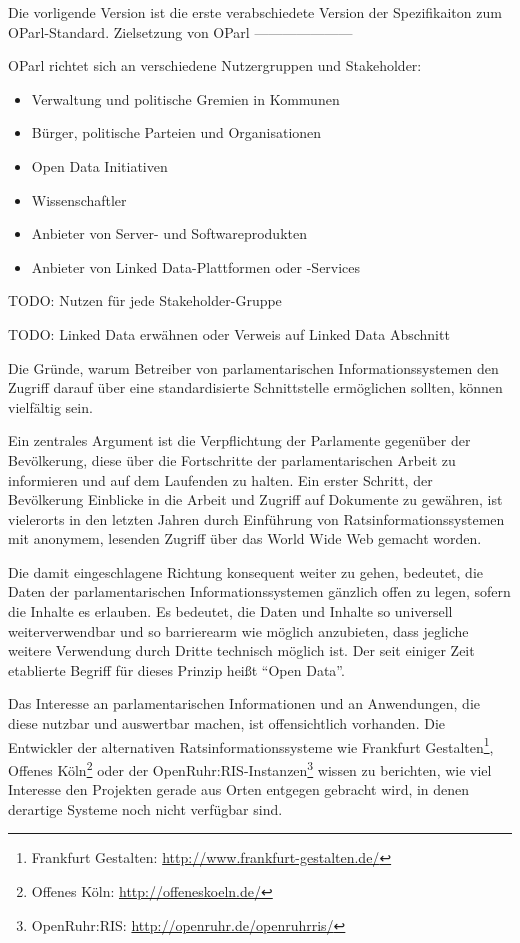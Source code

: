\documentclass[,a4paper]{article}
\begin{document}
Die vorligende Version ist die erste verabschiedete Version der
Spezifikaiton zum OParl-Standard. Zielsetzung von OParl
---------------------

OParl richtet sich an verschiedene Nutzergruppen und Stakeholder:

\begin{itemize}
\itemsep1pt\parskip0pt
\item
  Verwaltung und politische Gremien in Kommunen
\item
  Bürger, politische Parteien und Organisationen
\item
  Open Data Initiativen
\item
  Wissenschaftler
\item
  Anbieter von Server- und Softwareprodukten
\item
  Anbieter von Linked Data-Plattformen oder -Services
\end{itemize}

TODO: Nutzen für jede Stakeholder-Gruppe

TODO: Linked Data erwähnen oder Verweis auf Linked Data Abschnitt

Die Gründe, warum Betreiber von parlamentarischen Informationssystemen
den Zugriff darauf über eine standardisierte Schnittstelle ermöglichen
sollten, können vielfältig sein.

Ein zentrales Argument ist die Verpflichtung der Parlamente gegenüber
der Bevölkerung, diese über die Fortschritte der parlamentarischen
Arbeit zu informieren und auf dem Laufenden zu halten. Ein erster
Schritt, der Bevölkerung Einblicke in die Arbeit und Zugriff auf
Dokumente zu gewähren, ist vielerorts in den letzten Jahren durch
Einführung von Ratsinformationssystemen mit anonymem, lesenden Zugriff
über das World Wide Web gemacht worden.

Die damit eingeschlagene Richtung konsequent weiter zu gehen, bedeutet,
die Daten der parlamentarischen Informationssystemen gänzlich offen zu
legen, sofern die Inhalte es erlauben. Es bedeutet, die Daten und
Inhalte so universell weiterverwendbar und so barrierearm wie möglich
anzubieten, dass jegliche weitere Verwendung durch Dritte technisch
möglich ist. Der seit einiger Zeit etablierte Begriff für dieses Prinzip
heißt ``Open Data''.

Das Interesse an parlamentarischen Informationen und an Anwendungen, die
diese nutzbar und auswertbar machen, ist offensichtlich vorhanden. Die
Entwickler der alternativen Ratsinformationssysteme wie Frankfurt
Gestalten\footnote{Frankfurt Gestalten:
  \url{http://www.frankfurt-gestalten.de/}}, Offenes Köln\footnote{Offenes
  Köln: \url{http://offeneskoeln.de/}} oder der
OpenRuhr:RIS-Instanzen\footnote{OpenRuhr:RIS:
  \url{http://openruhr.de/openruhrris/}} wissen zu berichten, wie viel
Interesse den Projekten gerade aus Orten entgegen gebracht wird, in
denen derartige Systeme noch nicht verfügbar sind.
\end{document}

